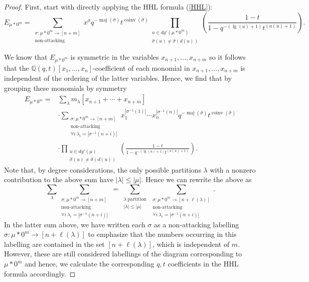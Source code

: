 \documentclass[11pt]{article}
\theoremstyle{definition}
\numberwithin{equation}{section}
\DeclareMathOperator{\maj}{maj}
\DeclareMathOperator{\coinv}{coinv}
\DeclareMathOperator{\mathleg}{lg}
\begin{document}
 \begin{proof}
 First, start with directly applying the HHL formula (\ref{HHL}):
  $$ E_{\mu * 0^m} = \sum_{\substack{\sigma: \mu * 0^m \rightarrow [n + m]\\ \text{non-attacking}}} x^{\sigma}q^{-\maj(\widehat{\sigma})}t^{\coinv(\widehat{\sigma})} \prod_{\substack{u \in dg'(\mu * 0^m) \\ \widehat{\sigma}(u) \neq \widehat{\sigma}(d(u))}} \left( \frac{1-t}{1-q^{-(\mathleg(u)+1)}t^{(a(u)+1)}} \right) .$$
  
  We know that $E_{\mu * 0^m}$ is symmetric in the variables $x_{n+1},\ldots,x_{n+m}$ \cite{C_2003} so it follows that the $\mathbb{Q}(q,t)[x_1,\ldots,x_n]$-coefficient of each monomial in $x_{n+1},\ldots,x_{n+m}$ is independent of the ordering of the latter variables. Hence, we find that by grouping these monomials by symmetry 
\begin{align*}
    E_{\mu * 0^m} = {} & {} \sum_{\lambda} m_{\lambda}[x_{n+1}+\cdots+x_{n+m}]  \\ 
    & \cdot \sum_{\substack{\sigma: \mu * 0^m \rightarrow [n + m] \\ \text{non-attacking} \\ \forall i ~ \lambda_i = |\sigma^{-1}(n+i)|  }} x_1 ^{|\sigma^{-1}(1)|}\cdots x_n ^{|\sigma^{-1}(n)|} q^{-\maj(\widehat{\sigma})}t^{\coinv(\widehat{\sigma})} \\
    & \cdot \prod_{\substack{u \in dg'(\mu) \\ \widehat{\sigma}(u) \neq \widehat{\sigma}(d(u))}} \left( \frac{1-t}{1-q^{-(\mathleg(u)+1)}t^{(a(u)+1)}} \right).
\end{align*}
 Note that, by degree considerations, the only possible partitions $\lambda$ with a nonzero contribution to the above sum have $|\lambda| \leq |\mu|$. Hence we can rewrite the above as 
  $$ \sum_{\lambda} \sum_{\substack{\sigma: \mu * 0^m \rightarrow [n + m] \\ \text{non-attacking} \\ \forall i ~ \lambda_i = |\sigma^{-1}(n+i)|  }} = \sum_{\substack{\lambda ~ \text{partition}  \\ |\lambda| \leq |\mu|}} \sum_{\substack{\sigma:\mu* 0^m \rightarrow [n+\ell(\lambda)]\\ \text{non-attacking} \\ \forall i ~ \lambda_i = |\sigma^{-1}(n+i)|}}    .$$
In the latter sum above, we have written each $\sigma$ as a non-attacking labelling $\sigma: \mu*0^m \rightarrow [n+\ell(\lambda)]$ to emphasize that the numbers occurring in this labelling are contained in the set $[n+\ell(\lambda)]$, which is independent of $m$. However, these are still considered labellings of the diagram corresponding to $\mu*0^m$ and hence, we calculate the corresponding $q,t$ coefficients in the HHL formula accordingly.
  

\end{proof}
\end{document}
